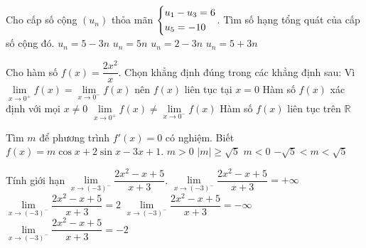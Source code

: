 \begin{ex}%
Cho cấp số cộng $\left(u_n\right)$ thỏa mãn $\left\{\begin{aligned}&u_1-u_3=6\\&u_5=-10\end{aligned}\right.$. Tìm số hạng tổng quát của cấp số cộng đó.
\choice
{\True $u_n=5-3n$}
{$u_n=5n$}
{$u_n=2-3n$}
{$u_n=5+3n$}
\end{ex}

\begin{ex}%
Cho hàm số $f(x)=\dfrac{2x^2}{x}$. Chọn khẳng định đúng trong các khẳng định sau:
\choice
{Vì $\lim\limits_{x\to 0^+}f(x)=\lim\limits_{x\to 0^-}f(x)$ nên $f(x)$ liên tục tại $x=0$}
{\True Hàm số $f(x)$ xác định với mọi $x\neq 0$}
{$\lim\limits_{x\to 0^+}f(x)\neq\lim\limits_{x\to 0^-}f(x)$}
{Hàm số $f(x)$ liên tục trên $\mathbb{R}$}
\end{ex}

\begin{ex}%
Tìm $m$ để phương trình $f'(x)=0$ có nghiệm. Biết $f(x)=m\cos x+2\sin x-3x+1$.
\choice
{$m>0$}
{\True $|m|\geq\sqrt{5}$}
{$m<0$}
{$-\sqrt{5}<m<\sqrt{5}$}
\end{ex}

\begin{ex}%
Tính giới hạn $\lim\limits_{x\to (-3)^-}\dfrac{2x^2-x+5}{x+3}$.
\choice
{$\lim\limits_{x\to (-3)^-}\dfrac{2x^2-x+5}{x+3}=+\infty$}
{$\lim\limits_{x\to (-3)^-}\dfrac{2x^2-x+5}{x+3}=2$}
{\True $\lim\limits_{x\to (-3)^-}\dfrac{2x^2-x+5}{x+3}=-\infty$}
{$\lim\limits_{x\to (-3)^-}\dfrac{2x^2-x+5}{x+3}=-2$}
\end{ex}


